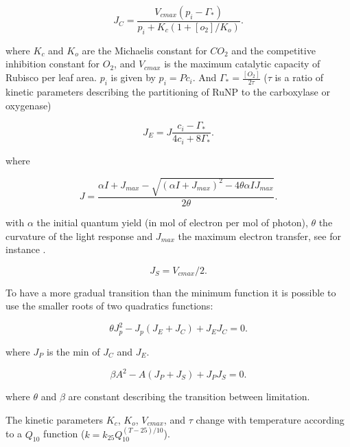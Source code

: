 \documentclass[a4paper,11pt]{article}
\begin{document}

\begin{equation}
\label{eq:JC}
J_C= \frac{V_{cmax} (p_i - \Gamma_*)}{p_i + K_c (1+[o_2]/K_o)}.
\end{equation}

where $K_c$ and $K_o$ are the Michaelis constant for $CO_2$ and the competitive inhibition constant for $O_2$, and $V_{cmax}$ is the maximum catalytic capacity of Rubisco per leaf area.
$p_i$ is given by $p_i = P c_i$. And $\Gamma_* = \frac{[O_2]}{2\tau}$ ($\tau$ is a ratio of kinetic parameters describing the partitioning of RuNP to the carboxylase or oxygenase)

\begin{equation}
\label{eq:JCb}
J_E = J \frac{ c_i - \Gamma_*}{4c_i + 8 \Gamma_*}.
\end{equation}

where

\begin{equation}
\label{eq:Jlight}
J = \frac{ \alpha I + J_{max} - \sqrt{(\alpha I + J_{max})^2 - 4 \theta \alpha I J_{max}}}{2\theta}.
\end{equation}

with $\alpha$ the initial quantum yield (in mol of electron per mol of photon), $\theta$ the curvature of the light response and $J_{max}$ the maximum electron transfer,
see for instance \citet{Bernacchi-2009}.


\begin{equation}
\label{eq:JS}
J_S= V_{cmax}/2.
\end{equation}

To have a more gradual transition than the minimum function it is possible to use the smaller roots of two quadratics functions:

\begin{equation}
\label{eq:Q1}
\theta J_p^2 - J_p(J_E+J_C) + J_E J_C= 0.
\end{equation}

where $J_P$ is the min of $J_C$ and $J_E$.

\begin{equation}
\label{eq:Q2}
\beta A^2 - A(J_P+J_S) + J_P J_S= 0.
\end{equation}

where $\theta$ and $\beta$ are constant describing the transition between limitation.

The kinetic parameters $K_c$, $K_o$, $V_{cmax}$, and $\tau$ change with temperature according to a $Q_{10}$ function ($k = k_{25} Q_{10}^{(T-25)/10}$).
\end{document}
